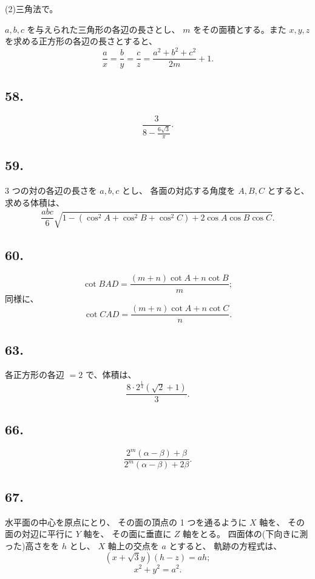 (2)三角法で。

$a, b, c$ を与えられた三角形の各辺の長さとし、
$m$ をその面積とする。また $x, y, z$ を求める正方形の各辺の長さとすると、
\[
\frac{a}{x} = \frac{b}{y} = \frac{c}{z}
=  \frac{a^2 + b^2 + c^2}{2m} + 1.
\]


\subsection*{58.}
\[
\frac{3}{8 - \frac{6 \sqrt{3}}{\pi}}.
\]


\subsection*{59.}

 3 つの対の各辺の長さを $a, b, c$ とし、
各面の対応する角度を $A, B, C$ とすると、
求める体積は、
\[
\frac{abc}{6} \sqrt{1 - (\cos^2 A + \cos^2 B + \cos^2 C)
 + 2 \cos A \cos B \cos C}.
\]


\subsection*{60.}

\[
\cot BAD = \frac{(m+n) \cot A + n \cot B}{m};
\]
同様に、
\[
\cot CAD = \frac{(m+n) \cot A + n \cot C}{n}.
\]

\subsection*{63.}

各正方形の各辺 $=2$ で、体積は、
\[
\frac{8 \cdot 2^{\frac{1}{4}} (\sqrt{2} + 1)}{3}.
\]


\subsection*{66.}

\[
\frac{2^m (\alpha - \beta) + \beta}{2^m (\alpha - \beta) + 2 \beta}.
\]


\subsection*{67.}

水平面の中心を原点にとり、
その面の頂点の 1 つを通るように $X$ 軸を、
その面の対辺に平行に $Y$ 軸を、
その面に垂直に $Z$ 軸をとる。
四面体の(下向きに測った)高さをを $h$ とし、
$X$ 軸上の交点を $a$ とすると、
軌跡の方程式は、
\[
(x + \sqrt{3} y)(h - z) = ah;
\]
\[
x^2 + y^2 = a^2.
\]

